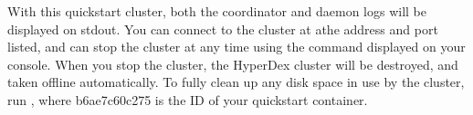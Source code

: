 With this quickstart cluster, both the coordinator and daemon logs will be
displayed on stdout.  You can connect to the cluster at athe address and port
listed, and can stop the cluster at any time using the command displayed on your
console.  When you stop the cluster, the HyperDex cluster will be destroyed, and
taken offline automatically.  To fully clean up any disk space in use by the
cluster, run , where b6ae7c60c275 is the ID of your
quickstart container.
